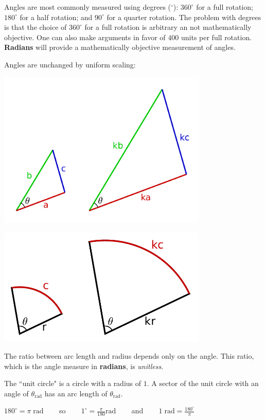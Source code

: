 \documentclass{article}
\begin{document}
Angles are most commonly measured using degrees (\(^\circ\)): \(360^\circ\) for a full rotation; \(180^\circ\) for a half rotation; and \(90^\circ\) for a quarter rotation. The problem with degrees is that the choice of \(360^\circ\) for a full rotation is arbitrary an not mathematically objective. One can also make arguments in favor of \(400\) units per full rotation. {\bf Radians} will provide a mathematically objective measurement of angles.

Angles are unchanged by uniform scaling:

\includegraphics[width = 0.75\textwidth]{triangle_scaling}

\includegraphics[width = 0.75\textwidth]{sector_scaling}

The ratio between arc length and radius depends only on the angle. This ratio, which is the angle measure in {\bf radians}, is \emph{unitless}. 

The ``unit circle" is a circle with a radius of \(1\). A sector of the unit circle with an angle of \(\theta_{\text{rad}}\) has an arc length of \(\theta_{\text{rad}}\). 

\(180^\circ = \pi \; \text{rad}\) ~~~ so ~~~ \(1^\circ = \frac{\pi}{180}\text{rad}\) ~~~ and ~~~ \(1\;\text{rad} = \frac{180^\circ}{\pi}\)
\end{document}
